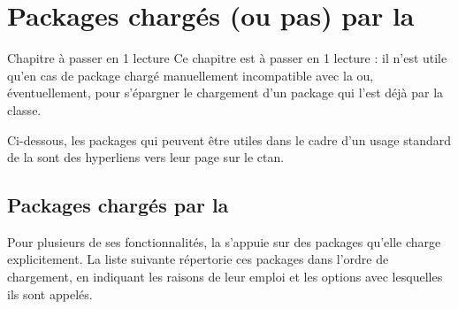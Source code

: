 \chapter{Packages chargés (ou pas) par la \yatcl{}}\label{cha:packages-charges}

\begin{dbremark*}{Chapitre à passer en 1\iere{} lecture}
  Ce chapitre est à passer en 1\iere{} lecture : il n'est utile qu'en cas de
  package chargé manuellement incompatible avec la \yatcl ou, éventuellement,
  pour s'épargner le chargement d'un package qui l'est déjà par la classe.
\end{dbremark*}

Ci-dessous, les packages qui peuvent être utiles dans le cadre d'un usage
standard de la \yatcl{} sont des hyperliens vers leur page sur le \gls{ctan}.

\section{Packages chargés par la \yatcl{}}

Pour plusieurs de ses fonctionnalités, la \yatcl s'appuie sur des packages
qu'elle charge explicitement. La liste suivante répertorie ces packages dans
l'ordre de chargement, en indiquant les raisons de leur emploi et les options
avec lesquelles ils sont appelés.

